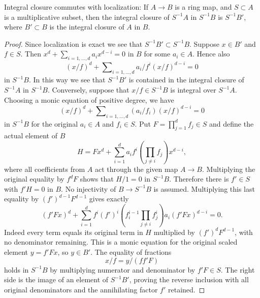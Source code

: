 \begin{lemma}
\label{editorial-source-lemma-integral-closure-localize}
Integral closure commutes with localization: If $A \to B$ is a ring
map, and $S \subset A$ is a multiplicative subset, then the integral
closure of $S^{-1}A$ in $S^{-1}B$ is $S^{-1}B'$, where $B' \subset B$
is the integral closure of $A$ in $B$.
\end{lemma}

\begin{proof}
Since localization is exact we see that $S^{-1}B' \subset S^{-1}B$.
Suppose $x \in B'$ and $f \in S$. Then
$x^d + \sum_{i = 1, \ldots, d} a_i x^{d - i} = 0$
in $B$ for some $a_i \in A$. Hence also
$$
(x/f)^d + \sum\nolimits_{i = 1, \ldots, d} a_i/f^i (x/f)^{d - i} = 0
$$
in $S^{-1}B$. In this way we see that $S^{-1}B'$ is contained in
the integral closure of $S^{-1}A$ in $S^{-1}B$. Conversely, suppose
that $x/f \in S^{-1}B$ is integral over $S^{-1}A$. Choosing a monic equation of positive degree, we have
$$
(x/f)^d + \sum\nolimits_{i = 1, \ldots, d} (a_i/f_i) (x/f)^{d - i} = 0
$$
in $S^{-1}B$ for the original $a_i\in A$ and $f_i\in S$.
Put $F=\prod_{j=1}^d f_j\in S$ and define the actual element of $B$
$$
H=Fx^d+\sum_{i=1}^d a_i f^i
\left(\prod_{j\ne i}f_j\right)x^{d-i},
$$
where all coefficients from $A$ act through the given map $A\to B$.
Multiplying the original equality by $f^dF$ shows that $H/1=0$
in $S^{-1}B$. Therefore there is $f'\in S$ with $f'H=0$ in $B$.
No injectivity of $B\to S^{-1}B$ is assumed. Multiplying this
last equality by $(f')^{d-1}F^{d-1}$ gives exactly
$$
(f'Fx)^d+
\sum_{i=1}^d f^i(f')^i
\left(f_i^{i-1}\prod_{j\ne i}f_j^i\right)a_i
(f'Fx)^{d-i}=0.
$$
Indeed every term equals its original term in $H$ multiplied by
$(f')^dF^{d-1}$, with no denominator remaining. This is a monic
equation for the original scaled element $y=f'Fx$, so $y\in B'$.
The equality of fractions
$$
x/f=y/(ff'F)
$$
holds in $S^{-1}B$ by multiplying numerator and denominator by
$f'F\in S$. The right side is the image of an element of
$S^{-1}B'$, proving the reverse inclusion with all original
denominators and the annihilating factor $f'$ retained.
\end{proof}